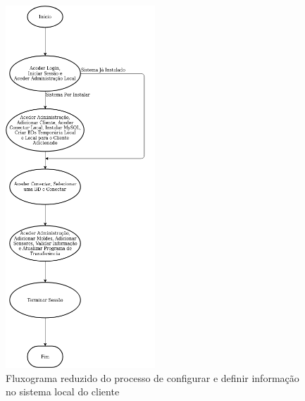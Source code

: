 \documentclass[11pt,twoside,a4paper]{report}
\begin{document}
\begin{figure}
	\begin{center}
		\hspace{3.5cm}
		\includegraphics[width=0.5\textwidth]{fluxograma_simples_administracao01} %
		\caption[Fluxograma reduzido do processo de configurar informação do cliente]{Fluxograma reduzido do processo de configurar e definir informação no sistema local do cliente}
		\label{fig:aplicacao_simples_admin}
	\end{center}
\end{figure}

\newpage
\end{document}
